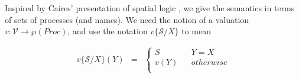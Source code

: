 \documentclass[]{amsart}
\makeatletter
\newcommand{\lpquote}{\ulcorner}
\newcommand{\rpquote}{\urcorner}
\newcommand{\id}[1]{\texttt{#1}}
\newcommand{\pzero}{\mathbin{0}}
\newcommand{\juxtap}{\mathbin{\id{|}}}
\newcommand{\concat}{\Rightarrow}
\newcommand{\scong}{\mathbin{\equiv}}
\newcommand{\nameeq}{\mathbin{\equiv_N}}
\newcommand{\binpar}[2]{#1 \juxtap #2}
\newcommand{\prefix}[3]{#1 ? ( #2 ) \concat #3}
\newcommand{\lift}[2]{#1 ! ( #2 )}
\newcommand{\quotep}[1]{@#1}
\newcommand{\dropn}[1]{*#1}
\newcommand{\substn}[2]{\id{\{} #1 / #2 \id{\}}}
\newcommand{\Proc}{\mathbin{Proc}}
\newcommand{\ptrue}{\mathbin{true}}
\newcommand{\pdropf}[1]{\rpquote #1 \lpquote}
\newcommand{\plift}[2]{#1 ! ( #2 )}
\newcommand{\pprefix}[3]{\langle #1 ? #2 \rangle #3}
\newcommand{\riff}{\Leftrightarrow}
\newcommand{\PropVar}{\mathbin{\mathcal{V}}}
\theoremstyle{definition}
\theoremstyle{remark}
\numberwithin{equation}{subsection}
\makeatother
\begin{document}


Inspired by Caires' presentation of spatial logic
\cite{DBLP:conf/fossacs/Caires04}, we give the semantics in terms of
sets of processes (and names). We need the notion of a valuation $v :
\PropVar \to \wp(\Proc)$, and use the notation $v\substn{\mathcal{S}}{X}$ to mean 

\begin{eqnarray}
  v\substn{\mathcal{S}}{X}(Y) & = &
  \left\{ \begin{array}{ccc}
      S & & Y = X \\
      v(Y) & & otherwise \\
    \end{array}
  \right.\nonumber
\end{eqnarray}
\end{document}

